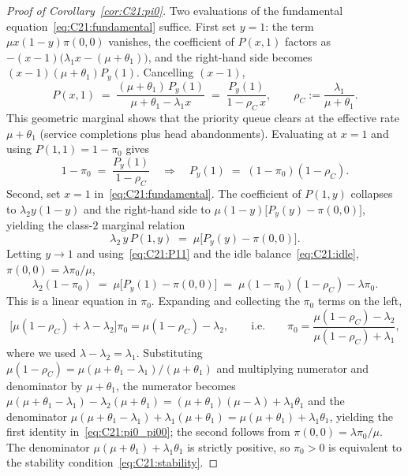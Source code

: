 \begin{proof}[Proof of Corollary~\ref{cor:C21:pi0}]
Two evaluations of the fundamental equation~\eqref{eq:C21:fundamental} suffice. First set
$y=1$: the term $\mu x(1-y)\pi(0,0)$ vanishes, the coefficient of $P(x,1)$ factors as
$-(x-1)\bigl(\lambda_1 x-(\mu+\theta_1)\bigr)$, and the right-hand side becomes
$(x-1)(\mu+\theta_1)P_y(1)$. Cancelling $(x-1)$,
\begin{equation}
    P(x,1) \;=\; \frac{(\mu+\theta_1)\,P_y(1)}{\mu+\theta_1-\lambda_1 x}
            \;=\; \frac{P_y(1)}{1-\rho_C\,x},
    \qquad \rho_C := \frac{\lambda_1}{\mu+\theta_1}.
    \label{eq:C21:Px1}
\end{equation}
This geometric marginal shows that the priority queue clears at the effective rate
$\mu+\theta_1$ (service completions plus head abandonments). Evaluating at $x=1$ and using
$P(1,1)=1-\pi_0$ gives
\begin{equation}
    1-\pi_0 \;=\; \frac{P_y(1)}{1-\rho_C}
    \quad\Longrightarrow\quad
    P_y(1) \;=\; (1-\pi_0)(1-\rho_C).
    \label{eq:C21:P11}
\end{equation}
Second, set $x=1$ in~\eqref{eq:C21:fundamental}. The coefficient of $P(1,y)$ collapses to
$\lambda_2 y(1-y)$ and the right-hand side to $\mu(1-y)\bigl[P_y(y)-\pi(0,0)\bigr]$,
yielding the class-$2$ marginal relation
\begin{equation}
    \lambda_2\,y\,P(1,y) \;=\; \mu\bigl[P_y(y)-\pi(0,0)\bigr].
    \label{eq:C21:P1y}
\end{equation}
Letting $y\to1$ and using~\eqref{eq:C21:P11} and the idle
balance~\eqref{eq:C21:idle}, $\pi(0,0)=\lambda\pi_0/\mu$,
\begin{equation*}
    \lambda_2(1-\pi_0) \;=\; \mu\bigl[P_y(1)-\pi(0,0)\bigr]
    \;=\; \mu(1-\pi_0)(1-\rho_C) - \lambda\pi_0.
\end{equation*}
This is a linear equation in $\pi_0$. Expanding and collecting the $\pi_0$ terms on the
left,
\begin{equation*}
    \bigl[\mu(1-\rho_C)+\lambda-\lambda_2\bigr]\pi_0 = \mu(1-\rho_C)-\lambda_2,
    \qquad\text{i.e.}\qquad
    \pi_0 = \frac{\mu(1-\rho_C)-\lambda_2}{\mu(1-\rho_C)+\lambda_1},
\end{equation*}
where we used $\lambda-\lambda_2=\lambda_1$. Substituting
$\mu(1-\rho_C)=\mu(\mu+\theta_1-\lambda_1)/(\mu+\theta_1)$ and multiplying numerator and
denominator by $\mu+\theta_1$, the numerator becomes
$\mu(\mu+\theta_1-\lambda_1)-\lambda_2(\mu+\theta_1)=(\mu+\theta_1)(\mu-\lambda)+\lambda_1\theta_1$
and the denominator $\mu(\mu+\theta_1-\lambda_1)+\lambda_1(\mu+\theta_1)=\mu(\mu+\theta_1)+\lambda_1\theta_1$,
yielding the first identity in~\eqref{eq:C21:pi0_pi00}; the second follows from
$\pi(0,0)=\lambda\pi_0/\mu$.
The denominator $\mu(\mu+\theta_1)+\lambda_1\theta_1$ is strictly positive, so $\pi_0>0$ is
equivalent to the stability condition~\eqref{eq:C21:stability}.
\end{proof}

